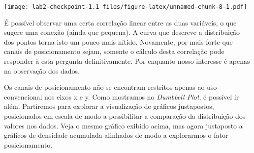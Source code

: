\documentclass[]{article}
\begin{document}
\texttt{[image: lab2-checkpoint-1.1\_files/figure-latex/unnamed-chunk-8-1.pdf]}

É possível observar uma certa correlação linear entre as duas variáveis,
o que sugere uma conexão (ainda que pequena). A curva que descreve a
distribuição dos pontos torna isto um pouco mais nítido. Novamente, por
mais forte que canais de posicionamento sejam, somente o cálculo desta
correlação pode responder à esta pergunta definitivamente. Por enquanto
nosso interesse é apenas na observação dos dados.

Os canais de posicionamento não se encontram restritos apenas ao uso
convencional nos eixos x e y. Como mostramos no \emph{Dumbbell Plot}, é
possível ir além. Partiremos para explorar a visualização de gráficos
justapostos, posicionados em escala de modo a possibilitar a comparação
da distribuição dos valores nos dados. Veja o mesmo gráfico exibido
acima, mas agora justaposto a gráficos de densidade acumulada alinhados
de modo a explorarmos o fator posicionamento.
\end{document}

